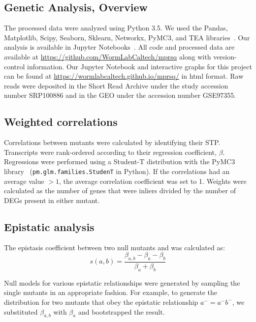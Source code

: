 \subsection*{Genetic Analysis, Overview}
The processed data were analyzed using Python 3.5. We used the Pandas,
Matplotlib, Scipy, Seaborn, Sklearn, Networkx, PyMC3, and TEA
libraries~\citep{McKinney2011,Oliphant2007,
Pedregosa2012,Salvatier2015,VanDerWalt2011,Hunter2007,Angeles-Albores2016,Waskom}.
Our analysis is available in Jupyter Notebooks~\citep{Perez2007}. All code and
processed data are available at
\url{https://github.com/WormLabCaltech/mprsq} along with version-control
information. Our Jupyter Notebook and interactive graphs for this project can be
found at \url{https://wormlabcaltech.github.io/mprsq/} in html format. Raw reads
were deposited in the Short Read Archive under the study accession number
SRP100886 and in the GEO under the accession number GSE97355.

\subsection*{Weighted correlations}
Correlations between mutants were calculated by identifying their
STP. Transcripts were rank-ordered according to their regression coefficient,
$\beta$. Regressions were performed using a Student-T
distribution with the PyMC3 library~\citep{Salvatier2015}
(\texttt{pm.glm.families.StudenT} in Python). If the correlations had an average
value $>1$, the average correlation coefficient was set to 1.
Weights were calculated as the number of genes that were inliers divided by the
number of DEGs present in either mutant.

\subsection*{Epistatic analysis}
The epistasis coefficient between two null mutants  and  was
calculated as:
\begin{equation}
  s(a, b) = \frac{\beta_{a,b} - \beta_a - \beta_b}{\beta_a + \beta_b}
\label{eq:epistasis_coef}
\end{equation}

Null models for various epistatic relationships were generated by sampling the
single mutants in an appropriate fashion. For example, to generate the
distribution for two mutants that obey the epistatic relationship $a^- =
a^-b^-$, we substituted $\beta_{a, b}$ with $\beta_a$ and bootstrapped the
result.

